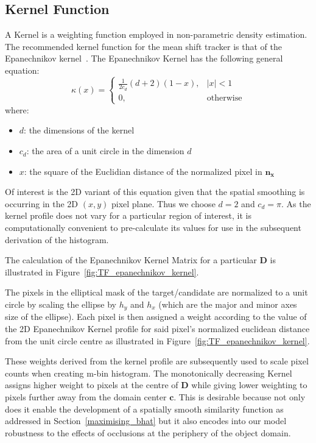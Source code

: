 \subsection{Kernel Function}
A Kernel is a weighting function employed in non-parametric density estimation.
The recommended kernel function for the mean shift tracker is that of the
Epanechnikov kernel~\cite{Comaniciu2002}.
The Epanechnikov Kernel has the following general equation:
\begin{equation}
    \kappa(x)=
    \begin{cases}
        \frac{1}{2c_d}(d+2)(1-x), & |x|<1 \\
        0, & \text{otherwise}
    \end{cases}
\end{equation}
where:
\begin{itemize}
   \item $d$: the dimensions of the kernel
   \item $c_d$: the area of a unit circle in the dimension $d$
   \item $x$: the square of the Euclidian distance of the normalized pixel in
       $\mathbf{n_x}$
\end{itemize}

Of interest is the 2D variant of this equation given that the spatial smoothing
is occurring in the 2D $(x,y)$ pixel plane. Thus we choose $d=2$ and $c_d=\pi$.
As the kernel profile does not vary for a particular region of interest, it is
computationally convenient to pre-calculate its values for use in the subsequent
derivation of the histogram.

The calculation of the Epanechnikov Kernel Matrix for a particular $\mathbf{D}$ is
illustrated in Figure~\ref{fig:TF_epanechnikov_kernel}.


The pixels in the elliptical mask of the target/candidate are normalized to a unit
circle by scaling the ellipse by $h_y$ and $h_x$ (which are the major and minor
axes size of the ellipse). Each pixel is then assigned a weight according to the
value of the 2D Epanechnikov Kernel profile for said pixel's normalized euclidean
distance from the unit circle centre as illustrated in Figure~\ref{fig:TF_epanechnikov_kernel}.

These weights derived from the kernel profile are subsequently used to scale
pixel counts when creating m-bin histogram. The monotonically decreasing Kernel
assigns higher weight to pixels at the centre of $\mathbf{D}$ while giving lower
weighting to pixels further away from the domain center $\mathbf{c}$. 
This is desirable because not only does it enable the development of a spatially
smooth similarity function as addressed in Section~\ref{maximising_bhat} but it
also encodes into our model robustness to the effects of occlusions at the
periphery of the object domain.

